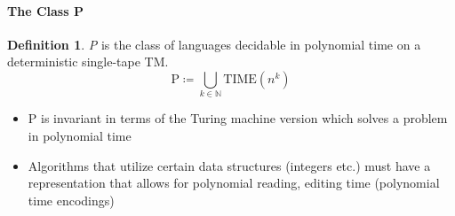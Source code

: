 \documentclass[10pt,fleqn]{article}
\theoremstyle{definition}
\newtheorem{definition}{Definition}
\theoremstyle{remark}
\newcommand{\pclass}{\text{P}}
\begin{document}
\paragraph*{The Class P}
\begin{definition}
    \emph{P} is the class of languages decidable in polynomial time on a deterministic single-tape TM.
    \[
        \pclass \coloneqq \bigcup_{k \in \mathbb{N}} \text{TIME}(n^k)
    \]
\end{definition}
\begin{itemize}
    \item P is invariant in terms of the Turing machine version which solves a problem in polynomial time
    \item Algorithms that utilize certain data structures (integers etc.) must have a representation that allows for polynomial reading, editing time (polynomial time encodings)
\end{itemize}
\newpage
\end{document}
